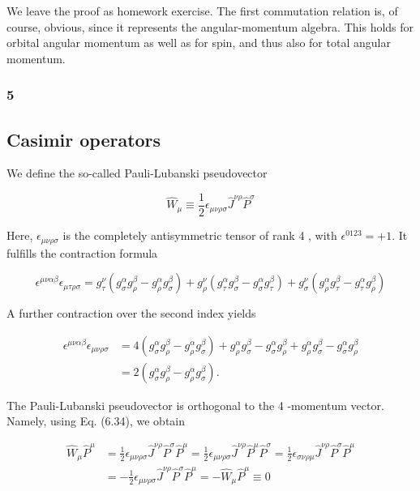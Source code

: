 \documentclass[10pt, letterpaper]{article}
\begin{document}
We leave the proof as homework exercise. The first commutation relation is, of course, obvious, since it represents the angular-momentum algebra. This holds for orbital angular momentum as well as for spin, and thus also for total angular momentum.

\subsubsection{5}
\subsection{Casimir operators}
We define the so-called Pauli-Lubanski pseudovector

$$
\hat{W}_{\mu} \equiv \frac{1}{2} \epsilon_{\mu \nu \rho \sigma} \hat{J}^{\nu \rho} \hat{P}^{\sigma}
$$

Here, $\epsilon_{\mu \nu \rho \sigma}$ is the completely antisymmetric tensor of rank 4 , with $\epsilon^{0123}=+1$. It fulfills the contraction formula

$$
\epsilon^{\mu \nu \alpha \beta} \epsilon_{\mu \tau \rho \sigma}=g_{\tau}^{\nu}\left(g_{\sigma}^{\alpha} g_{\rho}^{\beta}-g_{\rho}^{\alpha} g_{\sigma}^{\beta}\right)+g_{\rho}^{\nu}\left(g_{\tau}^{\alpha} g_{\sigma}^{\beta}-g_{\sigma}^{\alpha} g_{\tau}^{\beta}\right)+g_{\sigma}^{\nu}\left(g_{\rho}^{\alpha} g_{\tau}^{\beta}-g_{\tau}^{\alpha} g_{\rho}^{\beta}\right)
$$

A further contraction over the second index yields

$$
\begin{aligned}
\epsilon^{\mu \nu \alpha \beta} \epsilon_{\mu \nu \rho \sigma} & =4\left(g_{\sigma}^{\alpha} g_{\rho}^{\beta}-g_{\rho}^{\alpha} g_{\sigma}^{\beta}\right)+g_{\rho}^{\alpha} g_{\sigma}^{\beta}-g_{\sigma}^{\alpha} g_{\rho}^{\beta}+g_{\rho}^{\alpha} g_{\sigma}^{\beta}-g_{\sigma}^{\alpha} g_{\rho}^{\beta} \\
& =2\left(g_{\sigma}^{\alpha} g_{\rho}^{\beta}-g_{\rho}^{\alpha} g_{\sigma}^{\beta}\right) .
\end{aligned}
$$

The Pauli-Lubanski pseudovector is orthogonal to the 4 -momentum vector. Namely, using Eq. (6.34), we obtain

$$
\begin{aligned}
\hat{W}_{\mu} \hat{P}^{\mu} & =\frac{1}{2} \epsilon_{\mu \nu \rho \sigma} \hat{J}^{\nu \rho} \hat{P}^{\sigma} \hat{P}^{\mu}=\frac{1}{2} \epsilon_{\mu \nu \rho \sigma} \hat{J}^{\nu \rho} \hat{P}^{\mu} \hat{P}^{\sigma}=\frac{1}{2} \epsilon_{\sigma \nu \rho \mu} \hat{J}^{\nu \rho} \hat{P}^{\sigma} \hat{P}^{\mu} \\
& =-\frac{1}{2} \epsilon_{\mu \nu \rho \sigma} \hat{J}^{\nu \rho} \hat{P}^{\sigma} \hat{P}^{\mu}=-\hat{W}_{\mu} \hat{P}^{\mu} \equiv 0
\end{aligned}
$$
\end{document}
